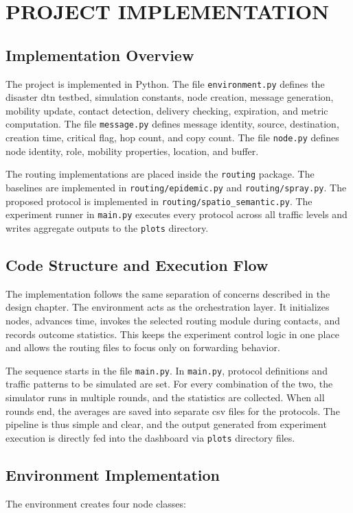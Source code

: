 \chapter{\MakeUppercase{Project Implementation}}
\section{Implementation Overview}
The project is implemented in Python. The file \verb|environment.py| defines the disaster \ac{dtn} testbed, simulation constants, node creation, message generation, mobility update, contact detection, delivery checking, expiration, and metric computation. The file \verb|message.py| defines message identity, source, destination, creation time, critical flag, hop count, and copy count. The file \verb|node.py| defines node identity, role, mobility properties, location, and buffer.

The routing implementations are placed inside the \verb|routing| package. The baselines are implemented in \verb|routing/epidemic.py| and \verb|routing/spray.py|. The proposed protocol is implemented in \verb|routing/spatio_semantic.py|. The experiment runner in \verb|main.py| executes every protocol across all traffic levels and writes aggregate outputs to the \verb|plots| directory.

\section{Code Structure and Execution Flow}
The implementation follows the same separation of concerns described in the design chapter. The environment acts as the orchestration layer. It initializes nodes, advances time, invokes the selected routing module during contacts, and records outcome statistics. This keeps the experiment control logic in one place and allows the routing files to focus only on forwarding behavior.

The sequence starts in the file \verb|main.py|. In \verb|main.py|, protocol definitions and traffic patterns to be simulated are set. For every combination of the two, the simulator runs in multiple rounds, and the statistics are collected. When all rounds end, the averages are saved into separate \ac{csv} files for the protocols. The pipeline is thus simple and clear, and the output generated from experiment execution is directly fed into the dashboard via \verb|plots| directory files.

\section{Environment Implementation}
The environment creates four node classes:

